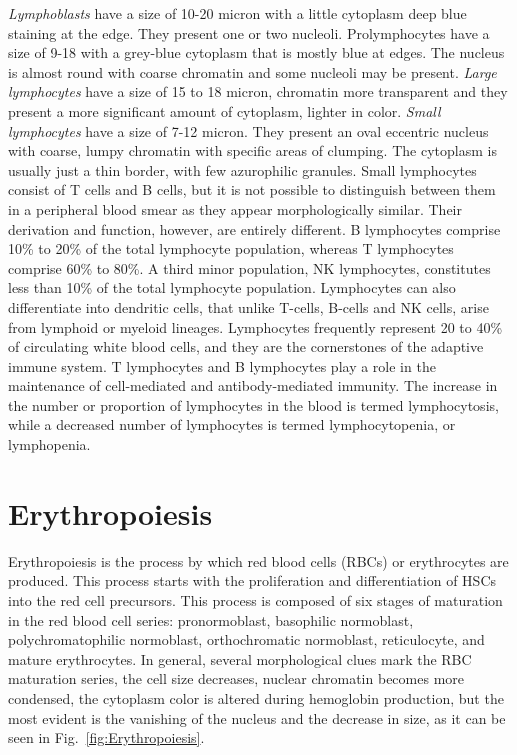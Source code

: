 \documentclass[final,a4paper,12pt,english]{UnicaPhdThesis3}
\begin{document}
{\textit{Lymphoblasts} have a size of 10-20 micron with a little cytoplasm deep blue staining at the edge. They present one or two nucleoli. Prolymphocytes have a size of 9-18 with a grey-blue cytoplasm that is mostly blue at edges. The nucleus is almost round with coarse chromatin and some nucleoli may be present. \textit{Large lymphocytes} have a size of 15 to 18 micron, chromatin more transparent and they present a more significant amount of cytoplasm, lighter in color. \textit{Small lymphocytes} have a size of 7-12 micron. They present an oval eccentric nucleus with coarse, lumpy chromatin with specific areas of clumping.
The cytoplasm is usually just a thin border, with few azurophilic granules. Small lymphocytes consist of T cells and B cells, but it is not possible to distinguish between them in a peripheral blood smear as they appear morphologically similar. Their derivation and function, however, are entirely different. B lymphocytes comprise 10\% to 20\% of the total lymphocyte population, whereas T lymphocytes comprise 60\% to 80\%. A third minor population, NK lymphocytes, constitutes less than 10\% of the total lymphocyte population. Lymphocytes can also differentiate into dendritic cells, that unlike T-cells, B-cells and NK cells, arise from lymphoid or myeloid lineages. Lymphocytes frequently represent 20 to 40\% of circulating white blood cells, and they are the cornerstones of the adaptive immune system. T lymphocytes and B lymphocytes play a role in the maintenance of cell-mediated and antibody-mediated immunity. The increase in the number or proportion of lymphocytes in the blood is termed lymphocytosis, while a decreased number of lymphocytes is termed lymphocytopenia, or lymphopenia.

\section{Erythropoiesis}
Erythropoiesis is the process by which red blood cells (RBCs) or erythrocytes are produced. This process starts with the proliferation and differentiation of HSCs into the red cell precursors. This process is composed of six stages of maturation in the red blood cell series: pronormoblast, basophilic normoblast, polychromatophilic normoblast, orthochromatic normoblast, reticulocyte, and mature erythrocytes. In general, several morphological clues mark the RBC maturation series, the cell size decreases, nuclear chromatin becomes more condensed, the cytoplasm color is altered during hemoglobin production, but the most evident is the vanishing of the nucleus and the decrease in size, as it can be seen in Fig.~\ref{fig:Erythropoiesis}.

}
\end{document}
